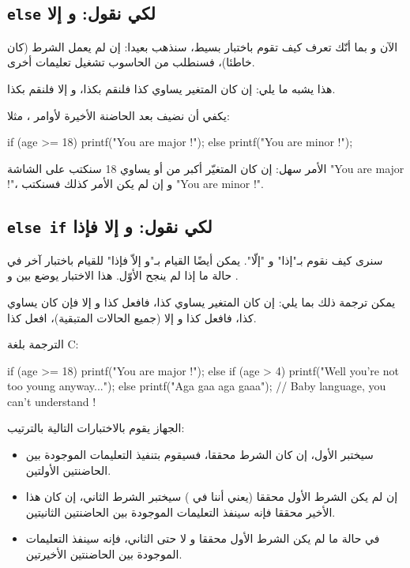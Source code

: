 \subsection{\texttt{else}
لكي نقول: و إلا}

الآن و بما أنّك تعرف كيف تقوم باختبار بسيط، سنذهب بعيدا: إن لم يعمل الشرط (كان خاطئا)، فسنطلب من الحاسوب تشغيل تعليمات أخرى.

هذا يشبه ما يلي: إن كان المتغير يساوي كذا فلنقم بكذا، و إلا فلنقم بكذا.

يكفي أن نضيف
بعد الحاضنة الأخيرة لأوامر ،
مثلا:
\begin{Csource}
if (age >= 18)
{
	printf("You are major !");
}
else {
	printf("You are minor !");
}
\end{Csource}

الأمر سهل: إن كان المتغيّر
أكبر من أو يساوي 18 سنكتب على الشاشة 
"\textenglish{You are major !}"،
و إن لم يكن الأمر كذلك فسنكتب 
"\textenglish{You are minor !}".

\subsection{\texttt{else if}
لكي نقول: و إلا فإذا}

سنرى كيف نقوم بـ"إذا" و "إلّا". يمكن أيضًا القيام بـ"و إلاّ فإذا" للقيام باختبار آخر في حالة ما إذا لم ينجح الأوّل. هذا الاختبار يوضع بين
و
.

يمكن ترجمة ذلك بما يلي: إن كان المتغير يساوي كذا، فافعل كذا و إلا فإن كان يساوي كذا، فافعل كذا و إلا (جميع الحالات المتبقية)، افعل كذا.

الترجمة بلغة
\textenglish{C}:

\begin{Csource}
if (age >= 18)
{
	printf("You are major !");
}
else if (age > 4)
{
	printf("Well you're not too young anyway...");
}
else
{
	printf("Aga gaa aga gaaa");
	// Baby language, you can't understand !
}
\end{Csource}

الجهاز يقوم بالاختبارات التالية بالترتيب:
\begin{itemize}
\item سيختبر 
الأول، إن كان الشرط محققا، فسيقوم بتنفيذ التعليمات الموجودة بين الحاضنتين الأولتين.
\item إن لم يكن الشرط الأول محققا (يعني أننا في )
سيختبر الشرط الثاني، إن كان هذا الأخير محققا فإنه سينفذ التعليمات الموجودة بين الحاضنتين الثانيتين.
\item في حالة ما لم يكن الشرط الأول محققا و لا حتى الثاني، فإنه سينفذ التعليمات الموجودة بين الحاضنتين الأخيرتين.
\end{itemize}

